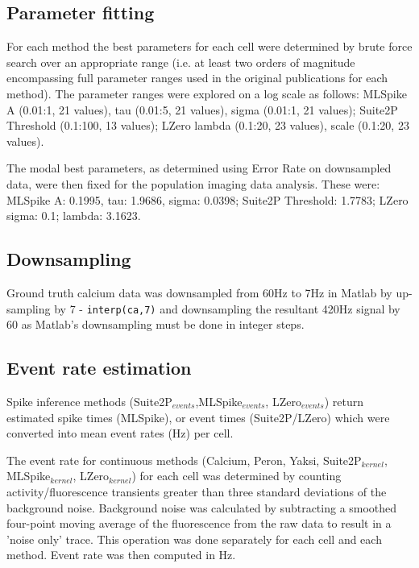 \documentclass[a4paper,11pt]{article}
\begin{document}
\subsection*{Parameter fitting}
For each method the best parameters for each cell were determined by brute force search over an appropriate range (i.e. at least two orders of magnitude encompassing full parameter ranges used in the original publications for each method). The parameter ranges were explored on a log scale as follows: MLSpike A (0.01:1, 21 values), tau (0.01:5, 21 values), sigma (0.01:1, 21 values); Suite2P Threshold (0.1:100, 13 values);  LZero lambda (0.1:20, 23 values), scale (0.1:20, 23 values). 

The modal best parameters, as determined using Error Rate on downsampled data, were then fixed for the population imaging data analysis. These were: MLSpike A: 0.1995, tau: 1.9686, sigma: 0.0398; Suite2P Threshold: 1.7783; LZero sigma: 0.1; lambda: 3.1623.



\subsection*{Downsampling}
Ground truth calcium data was downsampled from 60Hz to 7Hz in Matlab by up-sampling by 7 - {\tt{interp(ca,7)}} and downsampling the resultant 420Hz signal by 60 as Matlab's downsampling must be done in integer steps. 

\subsection{Event rate estimation}
Spike inference methods (Suite2P$_{events}$,MLSpike$_{events}$, LZero$_{events}$) return estimated spike times (MLSpike), or event times (Suite2P/LZero) which were converted into mean event rates (Hz) per cell.

The event rate for continuous methods (Calcium, Peron, Yaksi, Suite2P$_{kernel}$, MLSpike$_{kernel}$, LZero$_{kernel}$) for each cell was determined by counting activity/fluorescence transients greater than three standard deviations of the background noise. Background noise was calculated by subtracting a smoothed four-point moving average of the fluorescence from the raw data to result in a 'noise only' trace. This operation was done separately for each cell and each method. Event rate was then computed in Hz. 
\end{document}
